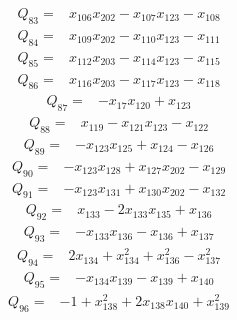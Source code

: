 \documentclass[11pt]{article}
\theoremstyle{definition}\newtheorem{definition}[theorem]{Definition}
\begin{document}
{%
\begin{align*}
 Q_{83}={}&x_{106}x_{202} -x_{107}x_{123} -x_{108}
\end{align*}
\begin{align*}
 Q_{84}={}&x_{109}x_{202} -x_{110}x_{123} -x_{111}
\end{align*}
\begin{align*}
 Q_{85}={}&x_{112}x_{203} -x_{114}x_{123} -x_{115}
\end{align*}
\begin{align*}
 Q_{86}={}&x_{116}x_{203} -x_{117}x_{123} -x_{118}
\end{align*}
\begin{align*}
 Q_{87}={}&-x_{17}x_{120} +x_{123}
\end{align*}
\begin{align*}
 Q_{88}={}&x_{119} -x_{121}x_{123} -x_{122}
\end{align*}
\begin{align*}
 Q_{89}={}&-x_{123}x_{125} +x_{124} -x_{126}
\end{align*}
\begin{align*}
 Q_{90}={}&-x_{123}x_{128} +x_{127}x_{202} -x_{129}
\end{align*}
\begin{align*}
 Q_{91}={}&-x_{123}x_{131} +x_{130}x_{202} -x_{132}
\end{align*}
\begin{align*}
 Q_{92}={}&x_{133} -2x_{133}x_{135} +x_{136}
\end{align*}
\begin{align*}
 Q_{93}={}&-x_{133}x_{136} -x_{136} +x_{137}
\end{align*}
\begin{align*}
 Q_{94}={}&2x_{134} +x_{134}^{2} +x_{136}^{2} -x_{137}^{2}
\end{align*}
\begin{align*}
 Q_{95}={}&-x_{134}x_{139} -x_{139} +x_{140}
\end{align*}
\begin{align*}
 Q_{96}={}&-1 +x_{138}^{2} +2x_{138}x_{140} +x_{139}^{2}

\end{align*}}
\end{document}
